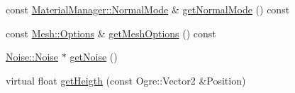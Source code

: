 \begin{CompactItemize}
const \hyperlink{class_hydrax_1_1_material_manager_aa14689cd1c259f48954dfecda9b296f}{MaterialManager::NormalMode} \& \hyperlink{class_hydrax_1_1_module_1_1_module_f5cfbabb783d9ded22f30f779c83c1c4}{getNormalMode} () const 
\item 
const \hyperlink{struct_hydrax_1_1_mesh_1_1_options}{Mesh::Options} \& \hyperlink{class_hydrax_1_1_module_1_1_module_7e083582d25431f9fbf83ce7eac77a94}{getMeshOptions} () const 
\item 
\hyperlink{class_hydrax_1_1_noise_1_1_noise}{Noise::Noise} $\ast$ \hyperlink{class_hydrax_1_1_module_1_1_module_e16db579f543cb24fdb7fcc909ee94cf}{getNoise} ()
\item 
virtual float \hyperlink{class_hydrax_1_1_module_1_1_module_c61f89589d3b1bc7256731ddb7af7d0b}{getHeigth} (const Ogre::Vector2 \&Position)
\end{CompactItemize}
